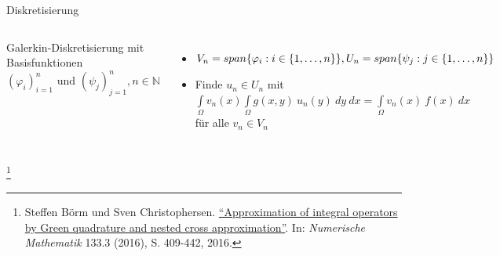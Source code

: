 \documentclass[10pt]{beamer}
\let\svthefootnote\thefootnote
\begin{document}
\begin{frame}{Diskretisierung}
  \begin{columns}
      Galerkin-Diskretisierung mit Basisfunktionen\\
      \({(\varphi_{i})}_{i = 1}^{n} \text{ und }
        {(\psi_{j})}_{j = 1}^{n}, n \in \mathbb{N}\)
      \begin{itemize}
        \item \( V_{n} = span\{ \varphi_{i} : i \in \{ 1, \hdots, n\} \},
                \newline
                U_{n} = span\{ \psi_{j} : j \in \{ 1, \hdots, n\} \} \)
        \item Finde \(u_{n} \in U_{n}\) mit\\
        \small{\( \int\limits_{\Omega} v_{n}(x) \int\limits_{\Omega} g(x,y) \
                  u_{n}(y)
                   \ dy \ dx = \int\limits_{\Omega} v_{n}(x) \ f(x) \ dx \) \\
                für alle \(v_{n} \in V_{n}\)}
      \end{itemize}
      \centering
      \includegraphics[width=1.5\linewidth]{figures/fg-sphere-tri.pdf}
  \end{columns}
  \footnotesize
  \let\thefootnote\relax\footnote{Steffen Börm und Sven Christophersen.
  \href{https://link.springer.com/article/10.1007\%2Fs00211-015-0757-y}{
  ``Approximation of integral operators by Green quadrature and nested cross 
  approximation''}. In:   \textit{Numerische Mathematik} 133.3 (2016), S. 
  409-442, 2016.}
  \addtocounter{footnote}{-1}\let\thefootnote\svthefootnote\relax
  \normalsize
\end{frame}
\end{document}
